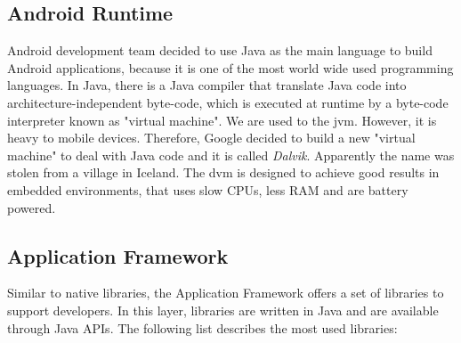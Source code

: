 \subsection{Android Runtime}

Android development team decided to use Java as the main language to build Android applications, because it is one of the most world wide used programming languages. In Java, there is a Java compiler that translate Java code into architecture-independent byte-code, which is executed at runtime by a byte-code interpreter known as "virtual machine". We are used to the \gls{jvm}. However, it is heavy to mobile devices. Therefore, Google decided to build a new "virtual machine" to deal with Java code and it is called \textit{Dalvik}. Apparently the name was stolen from a village in Iceland. The \gls{dvm} is designed to achieve good results in embedded environments, that uses slow CPUs, less RAM and are battery powered.


\subsection{Application Framework}

Similar to native libraries, the Application Framework offers a set of libraries to support developers. In this layer, libraries are written in Java and are available through Java APIs. The following list describes the most used libraries:

